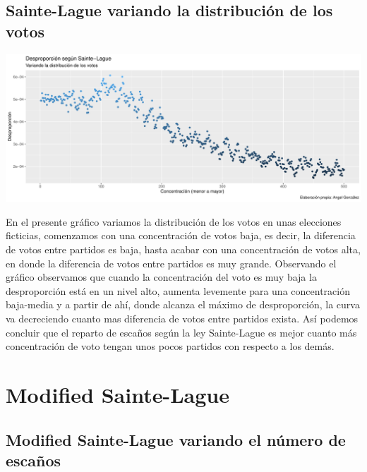 \documentclass[12pt,a4paper,]{book}
\numberwithin{dummy}{section}
\theoremstyle{ocrenumbox}
\theoremstyle{blacknumex}
\theoremstyle{blacknumbox}
\theoremstyle{ocrenum}
\theoremstyle{ocrenum}
\begin{document}
\hypertarget{sainte-lague-variando-la-distribuciuxf3n-de-los-votos}{%
\subsection{Sainte-Lague variando la distribución de los
votos}\label{sainte-lague-variando-la-distribuciuxf3n-de-los-votos}}

\begin{center}\includegraphics[width=0.95\linewidth]{figurasR/unnamed-chunk-19-1} \end{center}

En el presente gráfico variamos la distribución de los votos en unas
elecciones ficticias, comenzamos con una concentración de votos baja, es
decir, la diferencia de votos entre partidos es baja, hasta acabar con
una concentración de votos alta, en donde la diferencia de votos entre
partidos es muy grande. Observando el gráfico observamos que cuando la
concentración del voto es muy baja la desproporción está en un nivel
alto, aumenta levemente para una concentración baja-media y a partir de
ahí, donde alcanza el máximo de desproporción, la curva va decreciendo
cuanto mas diferencia de votos entre partidos exista. Así podemos
concluir que el reparto de escaños según la ley Sainte-Lague es mejor
cuanto más concentración de voto tengan unos pocos partidos con respecto
a los demás.

\hypertarget{modified-sainte-lague}{%
\section{Modified Sainte-Lague}\label{modified-sainte-lague}}

\hypertarget{modified-sainte-lague-variando-el-nuxfamero-de-escauxf1os}{%
\subsection{Modified Sainte-Lague variando el número de
escaños}\label{modified-sainte-lague-variando-el-nuxfamero-de-escauxf1os}}
\end{document}
